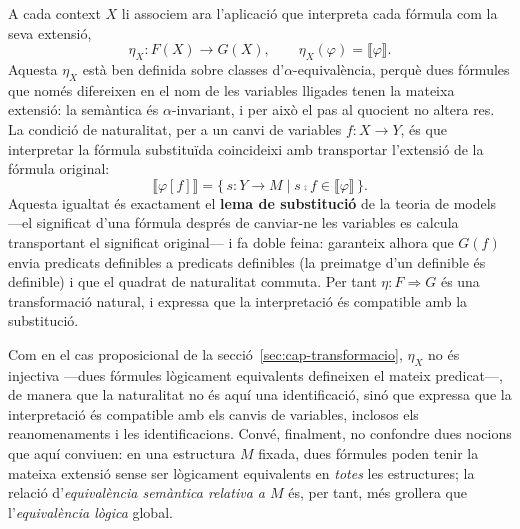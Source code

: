 \begin{exemple}
A cada context $X$ li associem ara l'aplicació que interpreta cada fórmula com la seva extensió,
\[
\eta_X\colon F(X)\to G(X),
\qquad
\eta_X(\varphi)=\llbracket\varphi\rrbracket.
\]
Aquesta $\eta_X$ està ben definida sobre classes d'$\alpha$-equivalència, perquè dues fórmules que només difereixen en el nom de les variables lligades tenen la mateixa extensió: la semàntica és $\alpha$-invariant, i per això el pas al quocient no altera res. La condició de naturalitat, per a un canvi de variables $f\colon X\to Y$, és que interpretar la fórmula substituïda coincideixi amb transportar l'extensió de la fórmula original:
\[
\llbracket\varphi[f]\rrbracket=\{\,s\colon Y\to M\mid s\comp f\in\llbracket\varphi\rrbracket\,\}.
\]
Aquesta igualtat és exactament el \textbf{lema de substitució} de la teoria de models ---el significat d'una fórmula després de canviar-ne les variables es calcula transportant el significat original--- i fa doble feina: garanteix alhora que $G(f)$ envia predicats definibles a predicats definibles (la preimatge d'un definible és definible) i que el quadrat de naturalitat commuta. Per tant $\eta\colon F\Rightarrow G$ és una transformació natural, i expressa que la interpretació és compatible amb la substitució.

Com en el cas proposicional de la secció~\ref{sec:cap-transformacio}, $\eta_X$ no és injectiva ---dues fórmules lògicament equivalents defineixen el mateix predicat---, de manera que la naturalitat no és aquí una identificació, sinó que expressa que la interpretació és compatible amb els canvis de variables, inclosos els reanomenaments i les identificacions. Convé, finalment, no confondre dues nocions que aquí conviuen: en una estructura $M$ fixada, dues fórmules poden tenir la mateixa extensió sense ser lògicament equivalents en \emph{totes} les estructures; la relació d'\emph{equivalència semàntica relativa a $M$} és, per tant, més grollera que l'\emph{equivalència lògica} global.
\end{exemple}
%

